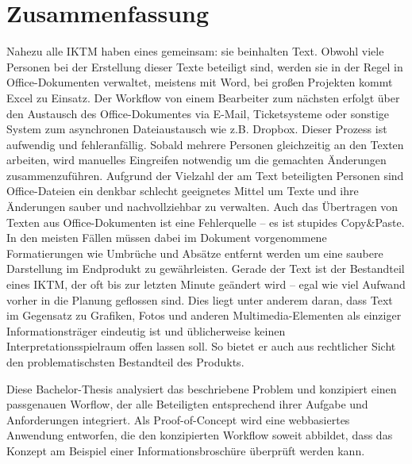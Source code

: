 \section*{Zusammenfassung}

Nahezu alle \ac{IKTM} haben eines gemeinsam: sie beinhalten Text. Obwohl viele Personen bei der Erstellung dieser Texte beteiligt sind, werden sie in der Regel in Office-Dokumenten verwaltet, meistens mit Word, bei großen Projekten kommt Excel zu Einsatz. Der Workflow von einem Bearbeiter zum nächsten erfolgt über den Austausch des Office-Dokumentes via E-Mail, Ticketsysteme oder sonstige System zum asynchronen Dateiaustausch wie z.B. Dropbox. Dieser Prozess ist aufwendig und fehleranfällig. Sobald mehrere Personen gleichzeitig an den Texten arbeiten, wird manuelles Eingreifen notwendig um die gemachten Änderungen zusammenzuführen. Aufgrund der Vielzahl der am Text beteiligten Personen sind Office-Dateien ein denkbar schlecht geeignetes Mittel um Texte und ihre Änderungen sauber und nachvollziehbar zu verwalten. Auch das Übertragen von Texten aus Office-Dokumenten ist eine Fehlerquelle – es ist stupides Copy\&Paste. In den meisten Fällen müssen dabei im Dokument vorgenommene Formatierungen wie Umbrüche und Absätze entfernt werden um eine saubere Darstellung im Endprodukt zu gewährleisten. Gerade der Text ist der Bestandteil eines \ac{IKTM}, der oft bis zur letzten Minute geändert wird – egal wie viel Aufwand vorher in die Planung geflossen sind. Dies liegt unter anderem daran, dass Text im Gegensatz zu Grafiken, Fotos und anderen Multimedia-Elementen als einziger Informationsträger eindeutig ist und üblicherweise keinen Interpretationsspielraum offen lassen soll. So bietet er auch aus rechtlicher Sicht den problematischsten Bestandteil des Produkts.

Diese Bachelor-Thesis analysiert das beschriebene Problem und konzipiert einen passgenauen Worflow, der alle Beteiligten entsprechend ihrer Aufgabe und Anforderungen integriert. Als Proof-of-Concept wird eine webbasiertes Anwendung entworfen, die den konzipierten Workflow soweit abbildet, dass das Konzept am Beispiel einer Informationsbroschüre überprüft werden kann. 


